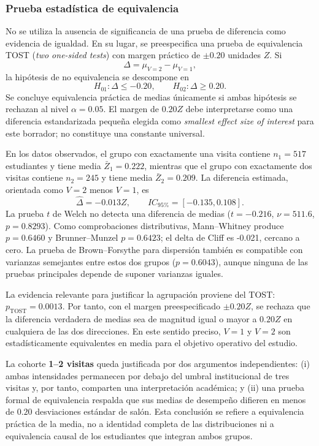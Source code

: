 \subsubsection{Prueba estadística de equivalencia}

No se utiliza la ausencia de significancia de una prueba de diferencia como evidencia de igualdad. En su lugar, se preespecifica una prueba de equivalencia TOST (\emph{two one-sided tests}) con margen práctico de $\pm0.20$ unidades $Z$. Si
\[
\Delta=\mu_{V=2}-\mu_{V=1},
\]
la hipótesis de no equivalencia se descompone en
\[
H_{01}:\Delta\leq -0.20,
\qquad
H_{02}:\Delta\geq 0.20.
\]
Se concluye equivalencia práctica de medias únicamente si ambas hipótesis se rechazan al nivel $\alpha=0.05$. El margen de $0.20Z$ debe interpretarse como una diferencia estandarizada pequeña elegida como \emph{smallest effect size of interest} para este borrador; no constituye una constante universal.

En los datos observados, el grupo con exactamente una visita contiene $n_1=517$ estudiantes y tiene media $\bar Z_1=0.222$, mientras que el grupo con exactamente dos visitas contiene $n_2=245$ y tiene media $\bar Z_2=0.209$. La diferencia estimada, orientada como $V=2$ menos $V=1$, es
\[
\widehat{\Delta}=-0.013Z,
\qquad IC_{95\%}=[-0.135,0.108].
\]
La prueba $t$ de Welch no detecta una diferencia de medias ($t=-0.216$, $\nu=511.6$, $p=0.8293$). Como comprobaciones distributivas, Mann--Whitney produce $p=0.6460$ y Brunner--Munzel $p=0.6423$; el delta de Cliff es -0.021, cercano a cero. La prueba de Brown--Forsythe para dispersión también es compatible con varianzas semejantes entre estos dos grupos ($p=0.6043$), aunque ninguna de las pruebas principales depende de suponer varianzas iguales.

La evidencia relevante para justificar la agrupación proviene del TOST: $p_{\mathrm{TOST}}=0.0013$. Por tanto, con el margen preespecificado $\pm0.20Z$, se rechaza que la diferencia verdadera de medias sea de magnitud igual o mayor a $0.20Z$ en cualquiera de las dos direcciones. En este sentido preciso, $V=1$ y $V=2$ son estadísticamente equivalentes en media para el objetivo operativo del estudio.

\begin{answerbox}
La cohorte \textbf{1--2 visitas} queda justificada por dos argumentos independientes: (i) ambas intensidades permanecen por debajo del umbral institucional de tres visitas y, por tanto, comparten una interpretación académica; y (ii) una prueba formal de equivalencia respalda que sus medias de desempeño difieren en menos de $0.20$ desviaciones estándar de salón. Esta conclusión se refiere a equivalencia práctica de la media, no a identidad completa de las distribuciones ni a equivalencia causal de los estudiantes que integran ambos grupos.
\end{answerbox}

